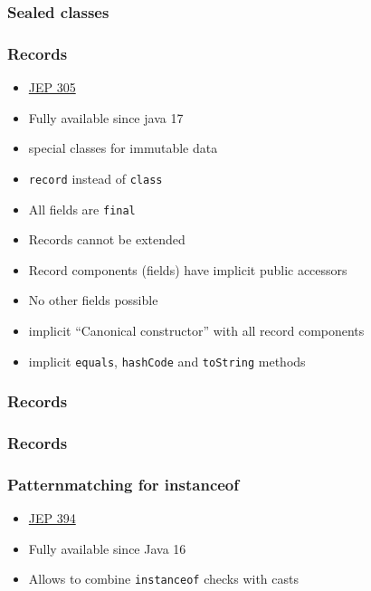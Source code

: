 \documentclass{beamer}
\begin{document}
\begin{frame}
\frametitle{Sealed classes}




\end{frame}

\begin{frame}
\frametitle{Records}
\begin{itemize}
  \item \href{https://openjdk.org/jeps/395}{JEP 305}
  \item Fully available since java 17
  \pause
  \item special classes for immutable data
  \item \texttt{record} instead of \texttt{class}
  \item All fields are \texttt{final}
  \item Records cannot be extended
  \item Record components (fields) have implicit public accessors
  \item No other fields possible
  \item implicit ``Canonical constructor'' with all record components
  \item implicit \texttt{equals}, \texttt{hashCode} and \texttt{toString} methods
\end{itemize}
\end{frame}
\begin{frame}
\frametitle{Records}

\end{frame}
\begin{frame}
\frametitle{Records}

\end{frame}

\begin{frame}
\frametitle{Patternmatching for instanceof}
\begin{itemize}
  \item \href{https://openjdk.org/jeps/394}{JEP 394}
  \item Fully available since Java 16
  \pause
  \item Allows to combine \texttt{instanceof} checks with casts
\end{itemize}
\pause

\end{frame}
\end{document}
